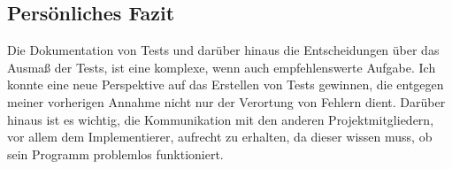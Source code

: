 \documentclass{scrartcl}
\begin{document}
\subsection{Persönliches Fazit}
Die Dokumentation von Tests und darüber hinaus die Entscheidungen über das Ausmaß der Tests, ist eine komplexe, wenn auch empfehlenswerte Aufgabe. Ich konnte eine neue Perspektive auf das Erstellen von Tests gewinnen, die entgegen meiner vorherigen Annahme nicht nur der Verortung von Fehlern dient. Darüber hinaus ist es wichtig, die Kommunikation mit den anderen Projektmitgliedern, vor allem dem Implementierer, aufrecht zu erhalten, da dieser wissen muss, ob sein Programm problemlos funktioniert.
\end{document}
